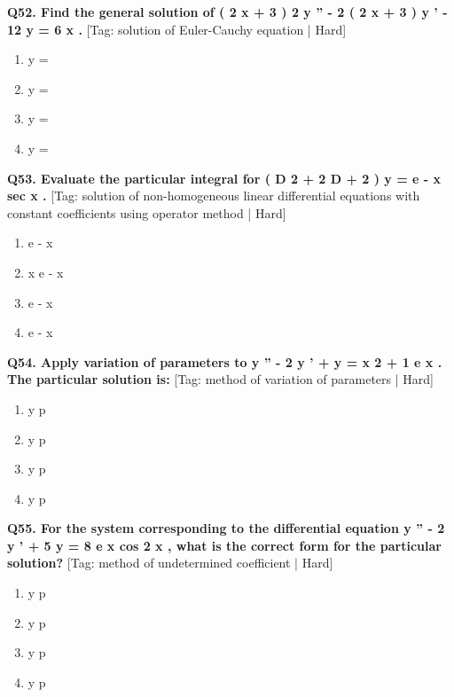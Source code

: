 \noindent\textbf{Q52. Find the general solution of ( 2 x + 3 ) 2 y '' - 2 ( 2 x + 3 ) y ' - 12 y = 6 x .} \hfill [Tag: solution of Euler-Cauchy equation | Hard]
\begin{enumerate}[label=(\alph*),topsep=2pt,itemsep=1pt,partopsep=0pt,parsep=0pt]
    \item {{y =}}
    \item {{y =}}
    \item {{y =}}
    \item {{y =}}
\end{enumerate}
\vspace{2mm}

\noindent\textbf{Q53. Evaluate the particular integral for ( D 2 + 2 D + 2 ) y = e - x sec x .} \hfill [Tag: solution of non-homogeneous linear differential equations with constant coefficients using operator method | Hard]
\begin{enumerate}[label=(\alph*),topsep=2pt,itemsep=1pt,partopsep=0pt,parsep=0pt]
    \item {{e - x}}
    \item {{x e - x}}
    \item {{e - x}}
    \item {{e - x}}
\end{enumerate}
\vspace{2mm}

\noindent\textbf{Q54. Apply variation of parameters to y '' - 2 y ' + y = x 2 + 1 e x . The particular solution is:} \hfill [Tag: method of variation of parameters | Hard]
\begin{enumerate}[label=(\alph*),topsep=2pt,itemsep=1pt,partopsep=0pt,parsep=0pt]
    \item {{y p}}
    \item {{y p}}
    \item {{y p}}
    \item {{y p}}
\end{enumerate}
\vspace{2mm}

\noindent\textbf{Q55. For the system corresponding to the differential equation y '' - 2 y ' + 5 y = 8 e x cos 2 x , what is the correct form for the particular solution?} \hfill [Tag: method of undetermined coefficient | Hard]
\begin{enumerate}[label=(\alph*),topsep=2pt,itemsep=1pt,partopsep=0pt,parsep=0pt]
    \item {{y p}}
    \item {{y p}}
    \item {{y p}}
    \item {{y p}}
\end{enumerate}
\vspace{2mm}

